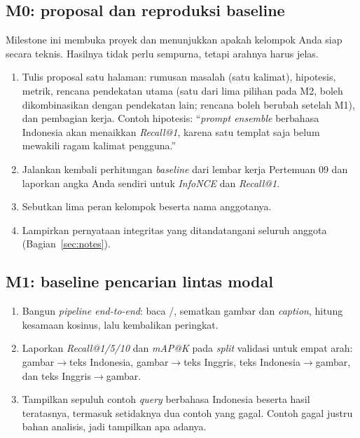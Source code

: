 \documentclass[12pt, a4paper]{article}
\begin{document}
\subsection{M0: proposal dan reproduksi baseline}

Milestone ini membuka proyek dan menunjukkan apakah kelompok Anda siap secara teknis. Hasilnya tidak perlu sempurna, tetapi arahnya harus jelas.

\begin{enumerate}
  \item Tulis proposal satu halaman: rumusan masalah (satu kalimat), hipotesis, metrik, rencana pendekatan utama (satu dari lima pilihan pada M2, boleh dikombinasikan dengan pendekatan lain; rencana boleh berubah setelah M1), dan pembagian kerja. Contoh hipotesis: ``\emph{prompt ensemble} berbahasa Indonesia akan menaikkan \emph{Recall@1}, karena satu templat saja belum mewakili ragam kalimat pengguna.''
  \item Jalankan kembali perhitungan \emph{baseline} dari lembar kerja Pertemuan 09 dan laporkan angka Anda sendiri untuk \emph{InfoNCE} dan \emph{Recall@1}.
  \item Sebutkan lima peran kelompok beserta nama anggotanya.
  \item Lampirkan pernyataan integritas yang ditandatangani seluruh anggota (Bagian~\ref{sec:notes}).
\end{enumerate}

\subsection{M1: baseline pencarian lintas modal}

\begin{enumerate}
  \item Bangun \emph{pipeline end-to-end}: baca /, sematkan gambar dan \emph{caption}, hitung kesamaan kosinus, lalu kembalikan peringkat.
  \item Laporkan \emph{Recall@1/5/10} dan \emph{mAP@K} pada \emph{split} validasi untuk empat arah: gambar$\rightarrow$teks Indonesia, gambar$\rightarrow$teks Inggris, teks Indonesia$\rightarrow$gambar, dan teks Inggris$\rightarrow$gambar.
  \item Tampilkan sepuluh contoh \emph{query} berbahasa Indonesia beserta hasil teratasnya, termasuk setidaknya dua contoh yang gagal. Contoh gagal justru bahan analisis, jadi tampilkan apa adanya.
\end{enumerate}
\end{document}

